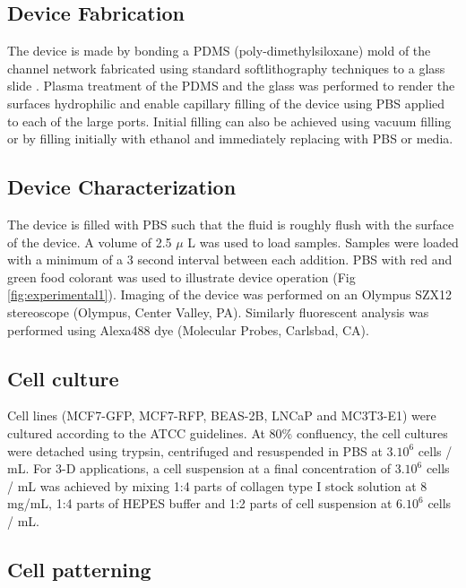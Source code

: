 \subsection{Device Fabrication}The device is made by bonding a PDMS (poly-dimethylsiloxane) mold of the channel network fabricated using standard softlithography techniques to a glass slide \cite{Jackman1998Fabricating-lar}.  Plasma treatment of the PDMS and the glass was performed to render the surfaces hydrophilic and enable capillary filling of the device using PBS applied to each of the large ports. Initial filling can also be achieved using vacuum filling\cite{Zhao:2009uq} or by filling initially with ethanol and immediately replacing with PBS or media.

\subsection{Device Characterization}

The device is filled with PBS such that the fluid is roughly flush with the surface of the device. A volume of 2.5 $\mu$ L was used to load samples. Samples were loaded with a minimum of a 3 second interval between each addition. PBS with red and green food colorant was used to illustrate device operation (Fig \ref{fig:experimental1}). Imaging of the device was performed on an Olympus SZX12 stereoscope (Olympus, Center Valley, PA). Similarly fluorescent analysis was performed using Alexa488 dye (Molecular Probes, Carlsbad, CA). 

\subsection{Cell culture}

Cell lines (MCF7-GFP, MCF7-RFP, BEAS-2B, LNCaP and MC3T3-E1) were cultured according to the ATCC guidelines. At 80\% confluency, the cell cultures were detached using trypsin, centrifuged and resuspended in PBS at 3.$10^{6}$ cells / mL. For 3-D applications, a cell suspension at a final concentration of 3.$10^{6}$ cells / mL was achieved by mixing 1:4 parts of collagen type I stock solution at 8 mg/mL, 1:4 parts of HEPES buffer and 1:2 parts of cell suspension at 6.$10^{6}$ cells / mL.

\subsection{Cell patterning}

